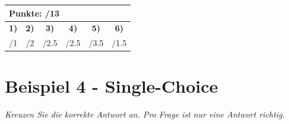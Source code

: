 \documentclass[11pt, a4paper]{article}
\begin{document}
\vfill
\begin{flushright}
\renewcommand{\arraystretch}{1.23}
\begin{tabular}{|c | c | c | c | c | c|}
\hline
\multicolumn{6}{|l|}{\textbf{\large{Punkte: \quad\quad\quad /13}}}\\
\hline
\textbf{1)} & \textbf{2)} & \textbf{3)} & \textbf{4)} & \textbf{5)} & \textbf{6)} \\
\quad/1 & \quad/2 & \quad/2.5 & \quad/2.5 & \quad/3.5 & \quad/1.5 \\
\hline
\end{tabular}
\end{flushright}

\newpage

\section*{Beispiel 4 - Single-Choice}
\textit{Kreuzen Sie die korrekte Antwort an. Pro Frage ist nur eine Antwort richtig.}
\end{document}
